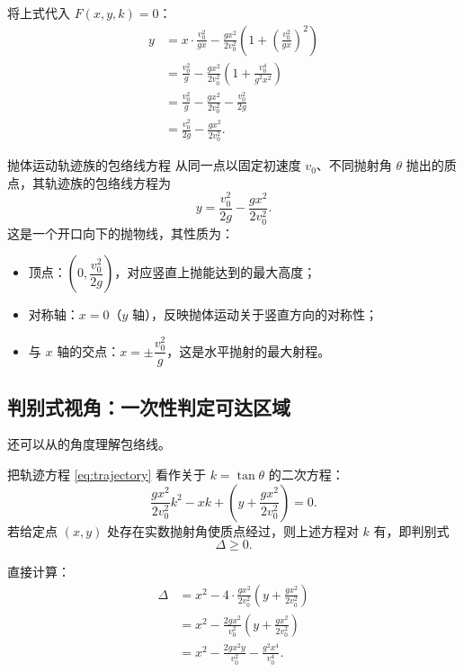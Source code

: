 \documentclass[a4paper,11pt]{ctexart}
\begin{document}
将上式代入 $F(x,y,k)=0$：
\begin{align}
  y
  &= x \cdot \frac{v_0^2}{gx}
     - \frac{gx^2}{2v_0^2}\left(1 + \left(\frac{v_0^2}{gx}\right)^2\right) \nonumber\\
  &= \frac{v_0^2}{g}
     - \frac{gx^2}{2v_0^2}\left(1 + \frac{v_0^4}{g^2x^2}\right) \nonumber\\
  &= \frac{v_0^2}{g}
     - \frac{gx^2}{2v_0^2}
     - \frac{v_0^2}{2g} \nonumber\\
  &= \frac{v_0^2}{2g}
     - \frac{gx^2}{2v_0^2}.
\end{align}

\begin{theorembox}{抛体运动轨迹族的包络线方程}
从同一点以固定初速度 $v_0$、不同抛射角 $\theta$ 抛出的质点，其轨迹族的包络线方程为
\begin{equation}
  y = \frac{v_0^2}{2g} - \frac{gx^2}{2v_0^2}. \label{eq:envelope}
\end{equation}
这是一个开口向下的抛物线，其性质为：
\begin{itemize}
  \item 顶点：$\left(0, \dfrac{v_0^2}{2g}\right)$，对应竖直上抛能达到的最大高度；
  \item 对称轴：$x = 0$（$y$ 轴），反映抛体运动关于竖直方向的对称性；
  \item 与 $x$ 轴的交点：$x = \pm \dfrac{v_0^2}{g}$，这是水平抛射的最大射程。
\end{itemize}
\end{theorembox}

\subsection{判别式视角：一次性判定可达区域}

还可以从的角度理解包络线。

把轨迹方程 \eqref{eq:trajectory} 看作关于 $k=\tan\theta$ 的二次方程：
\begin{equation}
  \frac{gx^2}{2v_0^2}k^2 - xk
  + \left(y + \frac{gx^2}{2v_0^2}\right) = 0.
\end{equation}
若给定点 $(x, y)$ 处存在实数抛射角使质点经过，则上述方程对 $k$ 有，即判别式
\[
  \Delta \geq 0.
\]

直接计算：
\begin{align}
  \Delta
  &= x^2
   - 4 \cdot \frac{gx^2}{2v_0^2}
     \left(y + \frac{gx^2}{2v_0^2}\right) \nonumber\\
  &= x^2
   - \frac{2gx^2}{v_0^2}\left(y + \frac{gx^2}{2v_0^2}\right) \nonumber\\
  &= x^2
   - \frac{2gx^2y}{v_0^2}
   - \frac{g^2x^4}{v_0^4}.
\end{align}
\end{document}

